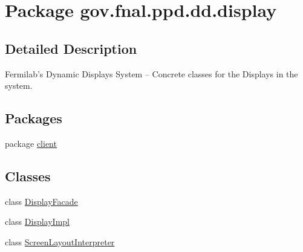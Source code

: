 \hypertarget{namespacegov_1_1fnal_1_1ppd_1_1dd_1_1display}{\section{Package gov.\-fnal.\-ppd.\-dd.\-display}
\label{namespacegov_1_1fnal_1_1ppd_1_1dd_1_1display}
}


\subsection{Detailed Description}
Fermilab's Dynamic Displays System -- Concrete classes for the Displays in the system.\subsection*{Packages}
\begin{DoxyCompactItemize}
\item 
package \hyperlink{namespacegov_1_1fnal_1_1ppd_1_1dd_1_1display_1_1client}{client}
\end{DoxyCompactItemize}
\subsection*{Classes}
\begin{DoxyCompactItemize}
\item 
class \hyperlink{classgov_1_1fnal_1_1ppd_1_1dd_1_1display_1_1DisplayFacade}{Display\-Facade}
\item 
class \hyperlink{classgov_1_1fnal_1_1ppd_1_1dd_1_1display_1_1DisplayImpl}{Display\-Impl}
\item 
class \hyperlink{classgov_1_1fnal_1_1ppd_1_1dd_1_1display_1_1ScreenLayoutInterpreter}{Screen\-Layout\-Interpreter}
\end{DoxyCompactItemize}

